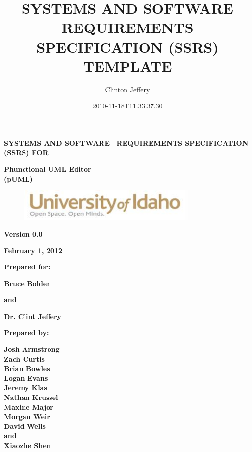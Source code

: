 \documentclass[twoside,letterpaper]{article}
\title{SYSTEMS AND SOFTWARE REQUIREMENTS SPECIFICATION (SSRS) TEMPLATE}
\author{Clinton Jeffery}
\date{2010-11-18T11:33:37.30}
\begin{document}
\clearpage
{\centering{}\bfseries\color{black}
SYSTEMS AND SOFTWARE \ REQUIREMENTS SPECIFICATION (SSRS) FOR
\par}


\bigskip

{\centering{}\bfseries\color{black}
Phunctional UML Editor
\\(pUML)
\par}


\bigskip


\bigskip


\bigskip

\begin{figure}
\centering
\includegraphics[width=3.5in]{uidahologo.jpg}
\end{figure}

\bigskip


\bigskip

{\centering{}\bfseries\color{black}
Version 0.0
\par}

{\centering{}\bfseries\color{black}
February 1, 2012
\par}


\bigskip


\bigskip

{\centering{}\bfseries\color{black}
Prepared for:
\par}
{\centering{}\bfseries\color{black}
Bruce Bolden
\par}
{\centering{}\bfseries\color{black}
and
\par}
{\centering{}\bfseries\color{black}
Dr. Clint Jeffery
\par}

\bigskip


\bigskip

{\centering{}\bfseries\color{black}
Prepared by:
\par}

{\centering{}\bfseries\color{black}
Josh Armstrong
\\Zach Curtis
\\Brian Bowles
\\Logan Evans
\\Jeremy Klas
\\Nathan Krussel
\\Maxine Major
\\Morgan Weir
\\David Wells
\\and
\\Xiaozhe Shen
\par}
\end{document}
